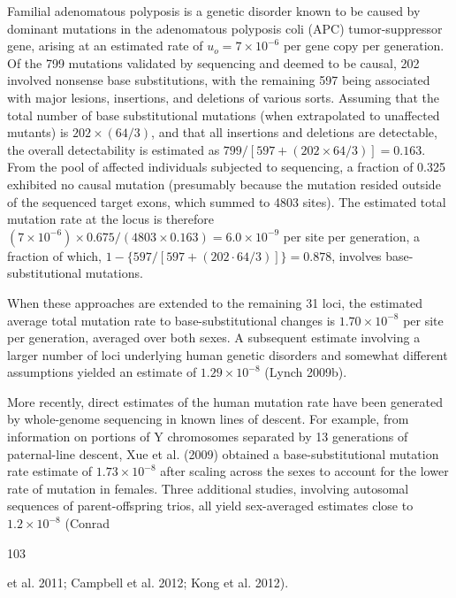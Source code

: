 \documentclass{article}
\begin{document}
Familial adenomatous polyposis is a genetic disorder known to be caused by dominant mutations in the adenomatous polyposis coli (APC) tumor-suppressor gene, arising at an estimated rate of  $ u_o = 7 \times 10^{-6} $ per gene copy per generation. Of the 799 mutations validated by sequencing and deemed to be causal, 202 involved nonsense base substitutions, with the remaining 597 being associated with major lesions, insertions, and deletions of various sorts. Assuming that the total number of base substitutional mutations (when extrapolated to unaffected mutants) is  $ 202 \times (64/3) $, and that all insertions and deletions are detectable, the overall detectability is estimated as  $ 799 / [597 + (202 \times 64/3)] = 0.163 $. From the pool of affected individuals subjected to sequencing, a fraction of 0.325 exhibited no causal mutation (presumably because the mutation resided outside of the sequenced target exons, which summed to 4803 sites). The estimated total mutation rate at the locus is therefore  $ (7 \times 10^{-6}) \times 0.675 / (4803 \times 0.163) = 6.0 \times 10^{-9} $ per site per generation, a fraction of which,  $ 1 - \{597 / [597 + (202 \cdot 64/3)]\} = 0.878 $, involves base-substitutional mutations.

When these approaches are extended to the remaining 31 loci, the estimated average total mutation rate to base-substitutional changes is  $ 1.70 \times 10^{-8} $ per site per generation, averaged over both sexes. A subsequent estimate involving a larger number of loci underlying human genetic disorders and somewhat different assumptions yielded an estimate of  $ 1.29 \times 10^{-8} $ (Lynch 2009b).

More recently, direct estimates of the human mutation rate have been generated by whole-genome sequencing in known lines of descent. For example, from information on portions of Y chromosomes separated by 13 generations of paternal-line descent, Xue et al. (2009) obtained a base-substitutional mutation rate estimate of  $ 1.73 \times 10^{-8} $ after scaling across the sexes to account for the lower rate of mutation in females. Three additional studies, involving autosomal sequences of parent-offspring trios, all yield sex-averaged estimates close to  $ 1.2 \times 10^{-8} $ (Conrad

103

et al. 2011; Campbell et al. 2012; Kong et al. 2012).
\end{document}
